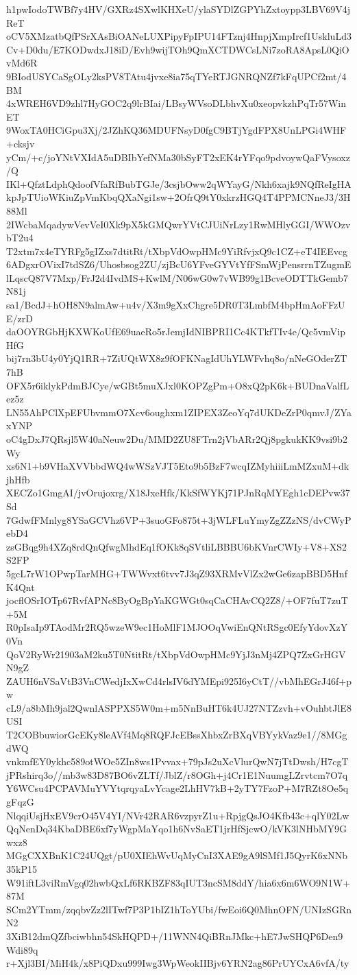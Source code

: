 h1pwIodoTWBf7y4HV/GXRz4SXwlKHXeU/ylaSYDlZGPYhZxtoypp3LBV69V4jReT
oCV5XMzatbQfPSrXAsBiOANeLUXPipyFpIPU14FTznj4HnpjXmpIrcf1UskluLd3
Cv+D0du/E7KODwdxJ18iD/Evh9wijTOh9QmXCTDWCsLNi7zoRA8ApsL0QiOvMd6R
9BIodUSYCaSgOLy2ksPV8TAtu4jvxe8ia75qTYeRTJGNRQNZf7kFqUPCf2mt/4BM
4xWREH6VD9zhl7HyGOC2q9lrBIai/LBsyWVsoDLbhvXu0xeopvkzhPqTr57WinET
9WoxTA0HCiGpu3Xj/2JZhKQ36MDUFNsyD0fgC9BTjYgdFPX8UnLPGi4WHF+cksjv
yCm/+c/joYNtVXIdA5uDBIbYefNMa30bSyFT2xEK4rYFqo9pdvoywQaFVysoxz/Q
IKl+QfztLdphQdoofVfaRfBubTGJe/3csjbOww2qWYayG/Nkh6xajk9NQfReIgHA
kpJpTUioWKiuZpVmKbqQXaNgi1sw+2OfrQ9tY0xkrzHGQ4T4PPMCNneJ3/3H88Ml
2IWcbaMqadywVevVeI0Xk9pX5kGMQwrYVtCJUiNrLzy1RwMHlyGGI/WWOzvbT2u4
T2xtm7x4eTYRFg5gIZxs7dtitRt/tXbpVdOwpHMc9YiRfvjxQ9c1CZ+eT4IEEvcg
6ADgxrOVixI7tdSZ6/Uhosbsog2ZU/zjBcU6YFveGYVtYfFSmWjPensrrnTZugmE
lLqscQ87V7Mxp/FrJ2d4IvdMS+KwlM/N06wG0w7vWB99g1BcveODTTkGemb7N81j
sa1/BcdJ+hOH8N9almAw+u4v/X3m9gXxChgre5DR0T3LmbfM4bpHmAoFFzUE/zrD
daOOYRGbHjKXWKoUfE69uaeRo5rJemjIdNIBPRI1Cc4KTkfTIv4e/Qc5vmVipHfG
bij7rn3bU4y0YjQ1RR+7ZiUQtWX8z9fOFKNagIdUhYLWFvhq8o/nNeGOderZT7hB
OFX5r6iklykPdmBJCye/wGBt5muXJxl0KOPZgPm+O8xQ2pK6k+BUDnaValfLez5z
LN55AhPClXpEFUbvmmO7Xcv6oughxm1ZIPEX3ZeoYq7dUKDeZrP0qmvJ/ZYaxYNP
oC4gDxJ7QRsjl5W40aNeuw2Du/MMD2ZU8FTrn2jVbARr2Qj8pgkukKK9vsi9b2Wy
xs6N1+b9VHaXVVbbdWQ4wWSzVJT5Eto9b5BzF7wcqIZMyhiiiLmMZxuM+dkjhHfb
XECZo1GmgAI/jvOrujoxrg/X18JxeHfk/KkSfWYKj71PJnRqMYEgh1cDEPvw37Sd
7GdwfFMnlyg8YSaGCVhz6VP+3suoGFo875t+3jWLFLuYmyZgZZzNS/dvCWyPebD4
zsGBqg9h4XZq8rdQnQfwgMhdEq1fOKk8qSVtliLBBBU6bKVnrCWIy+V8+XS2S2FP
5gcL7rW1OPwpTarMHG+TWWvxt6tvv7J3qZ93XRMvVlZx2wGe6zapBBD5HnfK4Qnt
jocflOSrIOTp67RvfAPNc8ByOgBpYaKGWGt0sqCaCHAvCQ2Z8/+OF7fuT7zuT+5M
R0pIsaIp9TAodMr2RQ5wzeW9ec1HoMlF1MJOOqVwiEnQNtRSgc0EfyYdovXzY0Vn
QoV2RyWr21903aM2ku5T0NtitRt/tXbpVdOwpHMc9YjJ3nMj4ZPQ7ZxGrHGVN9gZ
ZAUH6nVSaVtB3VnCWedjIxXwCd4rlsIV6dYMEpi925I6yCtT//vbMhEGrJ46f+pw
cL9/a8bMh9jal2QwnlASPPXS5W0m+m5NnBuHT6k4UJ27NTZzvh+vOuhbtJlE8USI
T2COBbuwiorGcEKy8leAVf4Mq8RQFJcEBssXhbxZrBXqVBYykVaz9e1//8MGgdWQ
vnkmfEY0ykhc589otWOe5ZIn8ws1Pvvax+79pJs2uXcVlurQwN7jTtDwsh/H7cgT
jPRshirq3o//mb3w83D87BO6vZLTf/JblZ/r8OGh+j4Cr1E1NuumgLZrvtcm7O7q
Y6WCsu4PCPAVMuYVYtqrqyaLvYcage2LhHV7kB+2yTY7FzoP+M7RZt8Oe5qgFqzG
NlqqiUsjHxEV9crO45V4YI/NVr42RAR6vzpyrZ1u+RpjgQsJO4Kfb43c+qlY02Lw
QqNenDq34KbaDBE6xf7yWgpMaYqo1h6NvSaET1jrHfSjcwO/kVK3lNHbMY9Gwxz8
MGgCXXBnK1C24UQgt/pU0XIEhWvUqMyCnI3XAE9gA9lSMf1J5QyrK6xNNb35kP15
W91iftL3viRmVgq02hwbQxLf6RKBZF83qIUT3ncSM8ddY/hia6x6m6WO9N1W+87M
SCm2YTmm/zqqbvZz2lITwf7P3P1bIZ1hToYUbi/fwEoi6Q0MhnOFN/UNIzSGRnN2
3XiB12dmQZfbciwbhn54SkHQPD+/11WNN4QiBRnJMkc+hE7JwSHQP6Den9Wdi89q
r+Xjl3BI/MiH4k/x8PiQDxu999Iwg3WpWeokIIBjv6YRN2ag86PrUYCxA6vfA/ty
